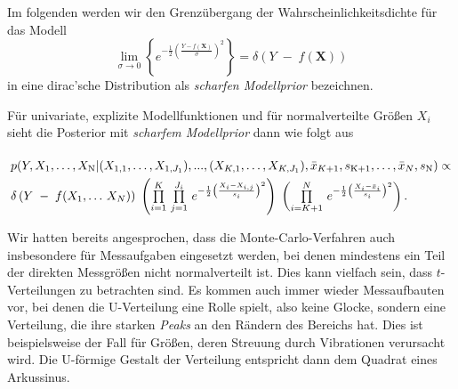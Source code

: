 Im folgenden werden wir den Grenzübergang der Wahrscheinlichkeitsdichte für das Modell
\begin{equation}
\lim_{\sigma \rightarrow 0} \left\{ e^{-\frac{1}{2} \left(\frac{Y-f(\mathbf{X})}{\sigma}\right)^2} \right\}
= \delta\left(Y \; - \;f(\mathbf{X})\right)
\end{equation}
in eine dirac'sche Distribution als \textsl{scharfen Modellprior} bezeichnen.

Für univariate, explizite Modellfunktionen und für normalverteilte Größen $X_i$ sieht die
Posterior mit \textsl{scharfem Modellprior} dann wie folgt aus
\begin{equation}
\arraycolsep=2.0pt\def\arraystretch{2.0}
\begin{array}{l}
p(Y, X_\mathrm{1}, \dots, X_\mathrm{N} | (X_{1,1}, \dots, X_{1,J_1}), ..., (X_{K,1}, \dots, X_{K,J_1}),
 \bar x_{K+1}, s_\mathrm{K+1}, \dots, \bar x_{N}, s_\mathrm{N}) \propto \\
\delta\left(Y \; - \; f(X_1, \dots \, X_N)\right)
\; \left( \prod\limits_{i=1}^K \, \prod\limits_{j=1}^{J_i}  \, 
e^{-\frac{1}{2} \left(\frac{ X_i - X_{i,j} }{s_i} \right)^2} \right)
\;  \left( \prod\limits_{i=K+1}^N \,  e^{-\frac{1}{2} \left(\frac{X_i - \bar x_i}{s_i} \right)^2} \right) .
\end{array}
\label{PosteriorFall4allgemeiner}
\end{equation}


Wir hatten bereits angesprochen, dass die Monte-Carlo-Verfahren auch insbesondere
für Messaufgaben eingesetzt werden, bei denen mindestens ein Teil der direkten Messgrößen nicht normalverteilt ist.
Dies kann vielfach sein, dass $t$-Verteilungen zu betrachten sind. Es kommen auch immer wieder Messaufbauten
vor, bei denen die U-Verteilung eine Rolle spielt, also keine Glocke, sondern
eine Verteilung, die ihre starken \textsl{Peaks} an den Rändern des Bereichs hat. Dies ist beispielsweise der
Fall für Größen, deren Streuung durch Vibrationen verursacht wird. Die U-förmige Gestalt der Verteilung entspricht dann
dem Quadrat eines Arkussinus.

